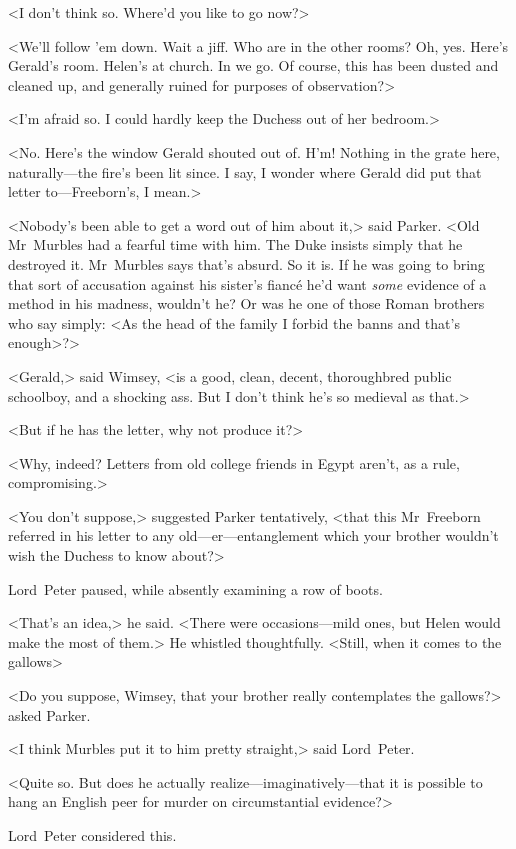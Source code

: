 <I don't think so. Where'd you like to go now?>

<We'll follow 'em down. Wait a jiff. Who are in the other rooms? Oh, yes. Here's Gerald's room. Helen's at church. In we go. Of course, this has been dusted and cleaned up, and generally ruined for purposes of observation?>

<I'm afraid so. I could hardly keep the Duchess out of her bedroom.>

<No. Here's the window Gerald shouted out of. H'm! Nothing in the grate here, naturally—the fire's been lit since. I say, I wonder where Gerald did put that letter to—Freeborn's, I mean.>

<Nobody's been able to get a word out of him about it,> said Parker. <Old Mr~Murbles had a fearful time with him. The Duke insists simply that he destroyed it. Mr~Murbles says that's absurd. So it is. If he was going to bring that sort of accusation against his sister's fiancé he'd want \emph{some} evidence of a method in his madness, wouldn't he? Or was he one of those Roman brothers who say simply: <As the head of the family I forbid the banns and that's enough>?>

<Gerald,> said Wimsey, <is a good, clean, decent, thoroughbred public schoolboy, and a shocking ass. But I don't think he's so medieval as that.>

<But if he has the letter, why not produce it?>

<Why, indeed? Letters from old college friends in Egypt aren't, as a rule, compromising.>

<You don't suppose,> suggested Parker tentatively, <that this Mr~Freeborn referred in his letter to any old—er—entanglement which your brother wouldn't wish the Duchess to know about?>

Lord~Peter paused, while absently examining a row of boots.

<That's an idea,> he said. <There were occasions—mild ones, but Helen would make the most of them.> He whistled thoughtfully. <Still, when it comes to the gallows\longdash>

<Do you suppose, Wimsey, that your brother really contemplates the gallows?> asked Parker.

<I think Murbles put it to him pretty straight,> said Lord~Peter.

<Quite so. But does he actually realize—imaginatively—that it is possible to hang an English peer for murder on circumstantial evidence?>

Lord~Peter considered this.

